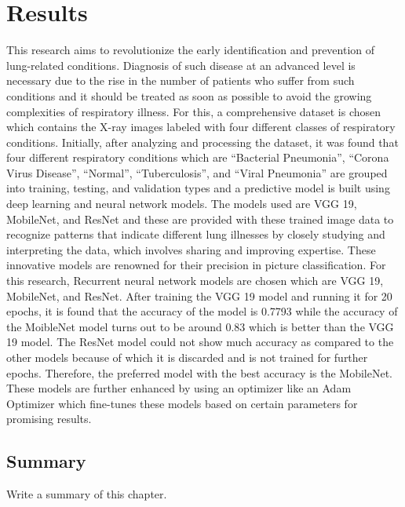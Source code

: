 \chapter{Results}
\label{ch:results}
This research aims to revolutionize the early identification and prevention of lung-related conditions. Diagnosis of such disease at an advanced level is necessary due to the rise in the number of patients who suffer from such conditions and it should be treated as soon as possible to avoid the growing complexities of respiratory illness. For this, a comprehensive dataset is chosen which contains the X-ray images labeled with four different classes of respiratory conditions. Initially, after analyzing and processing the dataset, it was found that four different respiratory conditions which are “Bacterial Pneumonia”, “Corona Virus Disease”, “Normal”, “Tuberculosis”, and “Viral Pneumonia” are grouped into training, testing, and validation types and a predictive model is built using deep learning and neural network models. The models used are VGG 19, MobileNet, and ResNet and these are provided with these trained image data to recognize patterns that indicate different lung illnesses by closely studying and interpreting the data, which involves sharing and improving expertise. These innovative models are renowned for their precision in picture classification. For this research, Recurrent neural network models are chosen which are VGG 19, MobileNet, and ResNet. After training the VGG 19 model and running it for 20 epochs, it is found that the accuracy of the model is 0.7793 while the accuracy of the MoibleNet model turns out to be around 0.83 which is better than the VGG 19 model. The ResNet model could not show much accuracy as compared to the other models because of which it is discarded and is not trained for further epochs. Therefore, the preferred model with the best accuracy is the MobileNet. These models are further enhanced by using an optimizer like an Adam Optimizer which fine-tunes these models based on certain parameters for promising results.




\section{Summary}
Write a summary of this chapter.



